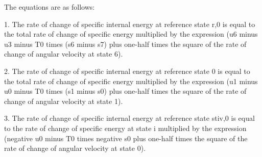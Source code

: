 The equations are as follows:

1. The rate of change of specific internal energy at reference state r,0 is equal to the total rate of change of specific energy multiplied by the expression (u6 minus u3 minus T0 times (s6 minus s7) plus one-half times the square of the rate of change of angular velocity at state 6).

2. The rate of change of specific internal energy at reference state 0 is equal to the total rate of change of specific energy multiplied by the expression (u1 minus u0 minus T0 times (s1 minus s0) plus one-half times the square of the rate of change of angular velocity at state 1).

3. The rate of change of specific internal energy at reference state stiv,0 is equal to the rate of change of specific energy at state i multiplied by the expression (negative u0 minus T0 times negative s0 plus one-half times the square of the rate of change of angular velocity at state 0).